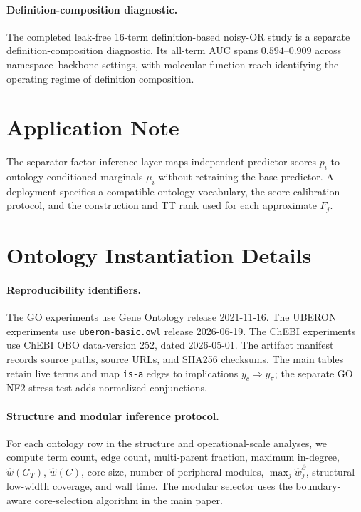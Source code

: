 \documentclass[letterpaper]{article}
\begin{document}
\paragraph{Definition-composition diagnostic.}
The completed leak-free 16-term definition-based noisy-OR study is a
separate definition-composition diagnostic. Its all-term AUC spans
\(0.594\)--\(0.909\) across namespace--backbone settings, with
molecular-function reach identifying the operating regime of definition
composition.

\section{Application Note}
The separator-factor inference layer maps independent predictor scores
\(p_i\) to ontology-conditioned marginals \(\mu_i\) without retraining the
base predictor. A deployment specifies a compatible ontology vocabulary,
the score-calibration protocol, and the construction and TT rank used for
each approximate \(F_j\).

\section{Ontology Instantiation Details}\label{app:multi-ontology}

\paragraph{Reproducibility identifiers.}
The GO experiments use Gene Ontology release 2021-11-16. The UBERON
experiments use \texttt{uberon-basic.owl} release 2026-06-19. The ChEBI
experiments use ChEBI OBO data-version 252, dated 2026-05-01. The artifact
manifest records source paths, source URLs, and SHA256 checksums. The main
tables retain live terms and map \texttt{is-a} edges to implications
\(y_c\Rightarrow y_\pi\); the separate GO NF2 stress test adds normalized
conjunctions.

\paragraph{Structure and modular inference protocol.}
For each ontology row in the structure and operational-scale analyses, we
compute term count, edge count,
multi-parent fraction, maximum in-degree, \(\widehat w(G_T)\),
\(\widehat w(C)\), core size, number of peripheral modules,
\(\max_j\widehat w_j^\partial\), structural low-width coverage, and wall
time. The modular selector uses the boundary-aware core-selection algorithm in the main paper.
\end{document}
